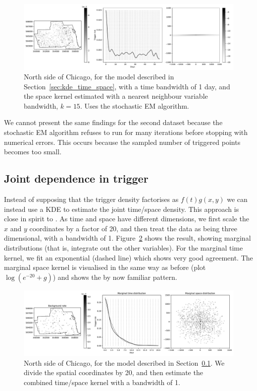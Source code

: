\documentclass[twoside,a4paper]{article}
\theoremstyle{plain}
\theoremstyle{definition}
\begin{document}
\begin{figure}
  \includegraphics[width=\textwidth]{../notebooks/grid_kde_knn_sem_1.pdf}
  \caption{North side of Chicago, for the model described in Section~\ref{sec:kde_time_space},
  with a time bandwidth of 1 day, and the space kernel estimated with a nearest neighbour variable
  bandwidth, $k=15$.  Uses the stochastic EM algorithm.}
  \label{fig:grid_kde_5}
\end{figure}

We cannot present the same findings for the second dataset because the stochastic EM algorithm
refuses to run for many iterations before stopping with numerical errors.  This occurs because
the sampled number of triggered points becomes too small.




\subsection{Joint dependence in trigger}\label{sec:joint_grid}

Instead of supposing that the trigger density factorises as $f(t)g(x,y)$ we can instead use a KDE
to estimate the joint time/space density.  This approach is close in spirit to \cite{sepp}.
As time and space have different dimensions, we first scale the $x$ and $y$ coordinates by a factor
of 20, and then treat the data as being three dimensional, with a bandwidth of 1.
Figure~\ref{fig:full_kde_1} shows the result, showing marginal distributions (that is, integrate
out the other variables).  For the marginal time kernel, we fit an exponential (dashed line)
which shows very good agreement.  The marginal space kernel is visualised in the same way as
before (plot $\log(e^{-20}+g)$) and shows the by now familiar pattern.

\begin{figure}
  \includegraphics[width=\textwidth]{../notebooks/full_kde_1.pdf}
  \caption{North side of Chicago, for the model described in Section~\ref{sec:joint_grid}.
  We divide the spatial coordinates by 20, and then estimate the combined time/space kernel
  with a bandwidth of 1.}
  \label{fig:full_kde_1}
\end{figure}
\end{document}
